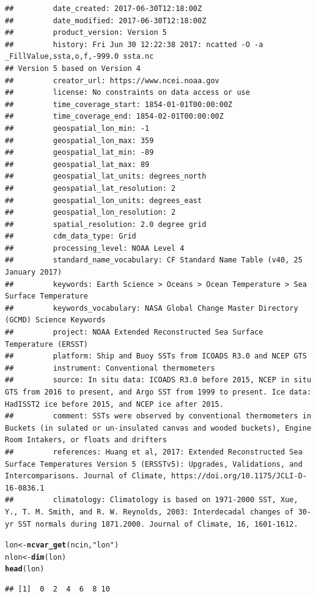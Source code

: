 \documentclass{article}\usepackage[]{graphicx}\usepackage[]{color}
\makeatletter
\newcommand{\hlstr}[1]{\textcolor[rgb]{0.192,0.494,0.8}{#1}}%
\newcommand{\hlstd}[1]{\textcolor[rgb]{0.345,0.345,0.345}{#1}}%
\newcommand{\hlkwb}[1]{\textcolor[rgb]{0.69,0.353,0.396}{#1}}%
\newcommand{\hlkwd}[1]{\textcolor[rgb]{0.737,0.353,0.396}{\textbf{#1}}}%
\newenvironment{kframe}{%
 \def\at@end@of@kframe{}%
 \ifinner\ifhmode%
  \def\at@end@of@kframe{\end{minipage}}%
  \begin{minipage}{\columnwidth}%
 \fi\fi%
 \def\FrameCommand##1{\hskip\@totalleftmargin \hskip-\fboxsep
 \colorbox{shadecolor}{##1}\hskip-\fboxsep
     \hskip-\linewidth \hskip-\@totalleftmargin \hskip\columnwidth}%
 \MakeFramed {\advance\hsize-\width
   \@totalleftmargin\z@ \linewidth\hsize
   \@setminipage}}%
 {\par\unskip\endMakeFramed%
 \at@end@of@kframe}
\newenvironment{knitrout}{}{} %
\makeatother
\begin{document}
\begin{knitrout}
\begin{kframe}
\begin{verbatim}
##         date_created: 2017-06-30T12:18:00Z
##         date_modified: 2017-06-30T12:18:00Z
##         product_version: Version 5
##         history: Fri Jun 30 12:22:38 2017: ncatted -O -a _FillValue,ssta,o,f,-999.0 ssta.nc
## Version 5 based on Version 4
##         creator_url: https://www.ncei.noaa.gov
##         license: No constraints on data access or use
##         time_coverage_start: 1854-01-01T00:00:00Z
##         time_coverage_end: 1854-02-01T00:00:00Z
##         geospatial_lon_min: -1
##         geospatial_lon_max: 359
##         geospatial_lat_min: -89
##         geospatial_lat_max: 89
##         geospatial_lat_units: degrees_north
##         geospatial_lat_resolution: 2
##         geospatial_lon_units: degrees_east
##         geospatial_lon_resolution: 2
##         spatial_resolution: 2.0 degree grid
##         cdm_data_type: Grid
##         processing_level: NOAA Level 4
##         standard_name_vocabulary: CF Standard Name Table (v40, 25 January 2017)
##         keywords: Earth Science > Oceans > Ocean Temperature > Sea Surface Temperature
##         keywords_vocabulary: NASA Global Change Master Directory (GCMD) Science Keywords
##         project: NOAA Extended Reconstructed Sea Surface Temperature (ERSST)
##         platform: Ship and Buoy SSTs from ICOADS R3.0 and NCEP GTS
##         instrument: Conventional thermometers
##         source: In situ data: ICOADS R3.0 before 2015, NCEP in situ GTS from 2016 to present, and Argo SST from 1999 to present. Ice data: HadISST2 ice before 2015, and NCEP ice after 2015.
##         comment: SSTs were observed by conventional thermometers in Buckets (in sulated or un-insulated canvas and wooded buckets), Engine Room Intakers, or floats and drifters
##         references: Huang et al, 2017: Extended Reconstructed Sea Surface Temperatures Version 5 (ERSSTv5): Upgrades, Validations, and Intercomparisons. Journal of Climate, https://doi.org/10.1175/JCLI-D-16-0836.1
##         climatology: Climatology is based on 1971-2000 SST, Xue, Y., T. M. Smith, and R. W. Reynolds, 2003: Interdecadal changes of 30-yr SST normals during 1871.2000. Journal of Climate, 16, 1601-1612.
\end{verbatim}
\begin{alltt}
\hlstd{lon} \hlkwb{<-} \hlkwd{ncvar_get}\hlstd{(ncin,} \hlstr{"lon"}\hlstd{)}
\hlstd{nlon} \hlkwb{<-} \hlkwd{dim}\hlstd{(lon)}
\hlkwd{head}\hlstd{(lon)}
\end{alltt}
\begin{verbatim}
## [1]  0  2  4  6  8 10
\end{verbatim}

\end{kframe}
\end{knitrout}
\end{document}

